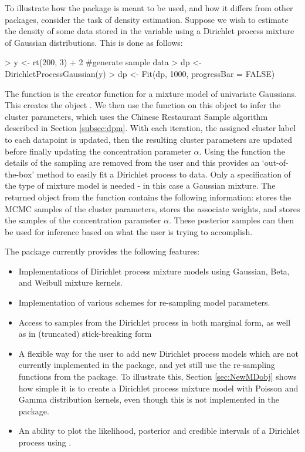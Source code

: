 \documentclass[nojss]{jss}
\begin{document}
To illustrate how the package is meant to be used, and how it differs from other  packages, consider the task of density estimation. Suppose we wish to estimate the density of some data stored in the variable  using a Dirichlet process mixture of Gaussian distributions. This is done as follows:

\begin{Schunk}
\begin{Sinput}
> y <- rt(200, 3) + 2 #generate sample data
> dp <- DirichletProcessGaussian(y)
> dp <- Fit(dp, 1000, progressBar = FALSE)
\end{Sinput}
\end{Schunk}

The function  is the creator function for a mixture model of univariate Gaussians. This creates the object . We then use the function  on this object to infer the cluster parameters, which uses the Chinese Restaurant Sample algorithm described in Section \ref{subsec:dpm}. With each iteration, the assigned cluster label to each datapoint is updated, then the resulting cluster parameters are updated before finally updating the concentration parameter $\alpha$. Using the  function the details of the sampling are removed from the user and this provides an `out-of-the-box' method to easily fit a Dirichlet process to data. Only a specification of the type of mixture model is needed - in this case a Gaussian mixture. The returned object  from the  function contains the following information:  stores the MCMC samples of the cluster parameters,  stores the associate weights, and  stores the samples of the concentration parameter $\alpha$. These posterior samples can then be used for inference based on what the user is trying to accomplish.

The  package currently provides the following features:

\begin{itemize}
\item Implementations of Dirichlet process mixture models using Gaussian, Beta, and Weibull mixture kernels.
\item Implementation of various schemes for re-sampling model parameters.
\item Access to samples from the Dirichlet process in both marginal form, as well as in (truncated) stick-breaking form
\item A flexible way for the user to add new Dirichlet process models which are not currently implemented in the package, and yet still use the re-sampling functions from the package. To illustrate this, Section \ref{sec:NewMDobj} shows how simple it is to create a Dirichlet process mixture model with Poisson and Gamma distribution kernels, even though this is not implemented in the package.
\item An ability to plot the likelihood, posterior and credible intervals of a Dirichlet process using .
\end{itemize}
\end{document}

